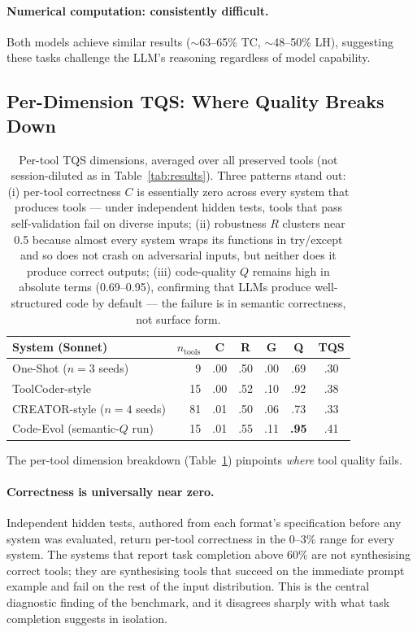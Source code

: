 \documentclass[sigplan,nonacm,natbib=false]{acmart}
\begin{document}
\paragraph{Numerical computation: consistently difficult.} Both models achieve similar results ($\sim$63--65\% TC, $\sim$48--50\% LH), suggesting these tasks challenge the LLM's reasoning regardless of model capability.

\subsection{Per-Dimension TQS: Where Quality Breaks Down}
\label{sec:tqs_analysis}

\begin{table}[t]
\centering
\footnotesize
\begin{tabular}{lrcccc|c}
\toprule
\textbf{System (Sonnet)} & $n_{\text{tools}}$ & \textbf{C} & \textbf{R} & \textbf{G} & \textbf{Q} & \textbf{TQS} \\
\midrule
One-Shot ($n{=}3$ seeds)     &  9 & .00 & .50 & .00 & .69 & .30 \\
ToolCoder-style              & 15 & .00 & .52 & .10 & .92 & .38 \\
CREATOR-style ($n{=}4$ seeds)& 81 & .01 & .50 & .06 & .73 & .33 \\
Code-Evol (semantic-$Q$ run) & 15 & .01 & .55 & .11 & \textbf{.95} & .41 \\
\bottomrule
\end{tabular}
\caption{Per-tool TQS dimensions, averaged over all preserved tools (not session-diluted as in Table~\ref{tab:results}). Three patterns stand out: (i) per-tool correctness $C$ is essentially zero across every system that produces tools --- under independent hidden tests, tools that pass self-validation fail on diverse inputs; (ii) robustness $R$ clusters near 0.5 because almost every system wraps its functions in try/except and so does not crash on adversarial inputs, but neither does it produce correct outputs; (iii) code-quality $Q$ remains high in absolute terms (0.69--0.95), confirming that LLMs produce well-structured code by default --- the failure is in semantic correctness, not surface form.}
\label{tab:tqs_dims}
\end{table}

The per-tool dimension breakdown (Table~\ref{tab:tqs_dims}) pinpoints \emph{where} tool quality fails.

\paragraph{Correctness is universally near zero.} Independent hidden tests, authored from each format's specification before any system was evaluated, return per-tool correctness in the 0--3\% range for every system. The systems that report task completion above 60\% are not synthesising correct tools; they are synthesising tools that succeed on the immediate prompt example and fail on the rest of the input distribution. This is the central diagnostic finding of the benchmark, and it disagrees sharply with what task completion suggests in isolation.
\end{document}
